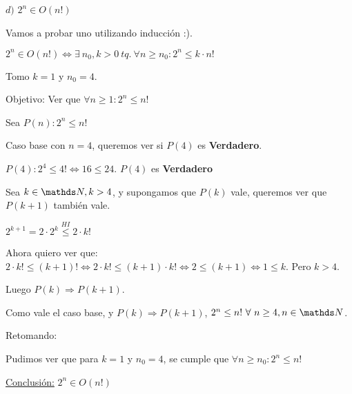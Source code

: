 \documentclass[10pt,a4paper]{article}
\begin{document}
\demoline
\demoline
\par $d)$ \ensuremath{2^n \in O(n!)}
\demoline
\begin{groupIzq}{2.5em}
  \par Vamos a probar uno utilizando inducción :).
  \par \ensuremath{2^n \in O(n!) \Leftrightarrow \exists\ n_0, k > 0\ tq.\ \forall n \geq n_0 : 2^n \leq k \cdot n!}
  \par Tomo \ensuremath{k=1} y \ensuremath{n_0 = 4}.
  \par Objetivo: Ver que \ensuremath{\forall n \geq 1 : 2^n \leq n!}
  \begin{groupIzq}{1em}
    \par Sea \ensuremath{P(n): 2^n \leq n!}
    \par Caso base con \ensuremath{n = 4}, queremos ver si \ensuremath{P(4)} es \textbf{Verdadero}.
    \par \ensuremath{P(4): 2^4 \leq 4! \Leftrightarrow 16 \leq 24}. \ensuremath{P(4)} es \textbf{Verdadero}
    \demoline
    \par Sea \ensuremath{k \in \nat, k > 4}, y supongamos que \ensuremath{P(k)} vale, queremos ver que \ensuremath{P(k + 1)} también vale.
    \par \ensuremath{2^{k+1} = 2 \cdot 2^k \overset{HI}{\leq} 2 \cdot k!}
    \par Ahora quiero ver que: \ensuremath{2 \cdot k! \leq (k + 1)! \Leftrightarrow 2 \cdot k! \leq (k + 1) \cdot k! \Leftrightarrow 2 \leq (k + 1) \Leftrightarrow 1 \leq k}. Pero \ensuremath{k > 4}.
    \par Luego \ensuremath{P(k) \Rightarrow P(k + 1)}.
    \par Como vale el caso base, y \ensuremath{P(k) \Rightarrow P(k + 1)}, \ensuremath{2^n \leq n!\ \forall\ n \geq 4, n \in \nat}.
  \end{groupIzq}
  \par Retomando:
  \par Pudimos ver que para \ensuremath{k=1} y \ensuremath{n_0 = 4}, se cumple que \ensuremath{\forall n \geq n_0: 2^n \leq n!}
  \par \underline{Conclusión:} \ensuremath{2^n \in O(n!)}
\end{groupIzq}
\end{document}
